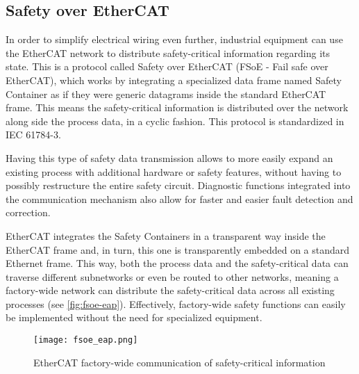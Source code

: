 \subsection{Safety over EtherCAT}

In order to simplify electrical wiring even further, industrial equipment can use the EtherCAT network to distribute safety-critical information regarding its state.
This is a protocol called Safety over EtherCAT (FSoE - Fail safe over EtherCAT), which works by integrating a specialized data frame named Safety Container as if they were generic datagrams inside the standard EtherCAT frame.
This means the safety-critical information is distributed over the network along side the process data, in a cyclic fashion.
This protocol is standardized in IEC 61784-3.

Having this type of safety data transmission allows to more easily expand an existing process with additional hardware or safety features, without having to possibly restructure the entire safety circuit.
Diagnostic functions integrated into the communication mechanism also allow for faster and easier fault detection and correction.

EtherCAT integrates the Safety Containers in a transparent way inside the EtherCAT frame and, in turn, this one is transparently embedded on a standard Ethernet frame.
This way, both the process data and the safety-critical data can traverse different subnetworks or even be routed to other networks, meaning a factory-wide network can distribute the safety-critical data across all existing processes (see \autoref{fig:fsoe-eap}).
Effectively, factory-wide safety functions can easily be implemented without the need for specialized equipment.

\begin{figure}[t]
	\centering
	\texttt{[image: fsoe\_eap.png]}
	\caption{EtherCAT factory-wide communication of safety-critical information \cite{technology:fsoe}}
	\label{fig:fsoe-eap}
\end{figure}
